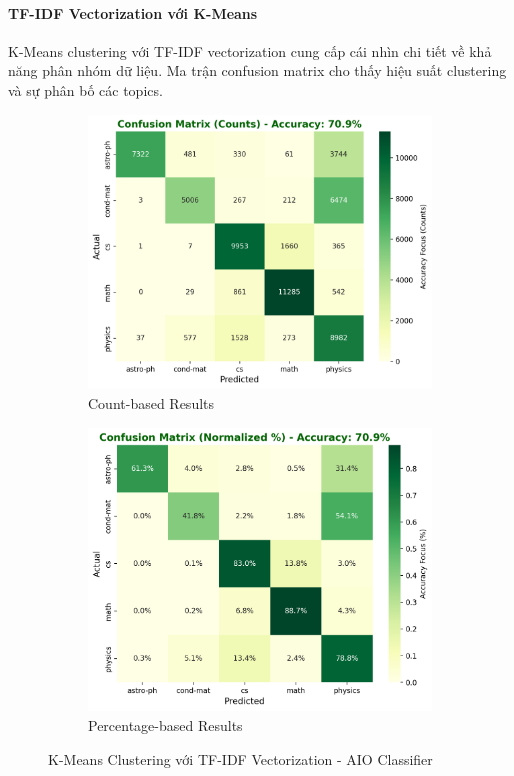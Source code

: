 \paragraph{TF-IDF Vectorization với K-Means}

K-Means clustering với TF-IDF vectorization cung cấp cái nhìn chi tiết về khả năng phân nhóm dữ liệu. Ma trận confusion matrix cho thấy hiệu suất clustering và sự phân bố các topics.

\begin{figure}[H]
\centering
\begin{subfigure}{0.48\textwidth}
    \centering
    \includegraphics[width=\textwidth]{image/Kmean_tfidf_count.png}
    \caption{Count-based Results}
    \label{fig:kmeans_tfidf_count_improvements}
\end{subfigure}
\hfill
\begin{subfigure}{0.48\textwidth}
    \centering
    \includegraphics[width=\textwidth]{image/Kmean_tfidf_percent.png}
    \caption{Percentage-based Results}
    \label{fig:kmeans_tfidf_percent_improvements}
\end{subfigure}
\caption{K-Means Clustering với TF-IDF Vectorization - AIO Classifier}
\label{fig:kmeans_tfidf_results_improvements}
\end{figure}

